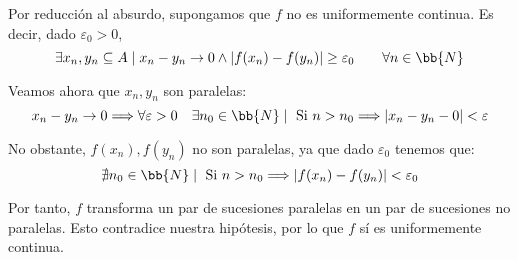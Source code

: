 \begin{ejercicio}
\begin{description}
        Por reducción al absurdo, supongamos que $f$ no es uniformemente continua. Es decir, dado $\varepsilon_0>0$,
        \begin{equation*}
            \exists x_n,y_n\subseteq A \mid x_n-y_n \to 0 \land |f(x_n)-f(y_n)| \geq \varepsilon_0 \qquad \forall n\in \bb{N}
        \end{equation*}

        Veamos ahora que $x_n,y_n$ son paralelas:
        \begin{equation*}
            x_n-y_n \to 0 \Longrightarrow 
            \forall {\varepsilon} >0\quad \exists n_0\in \bb{N}\mid \text{ Si } n>n_0 \Longrightarrow |x_n - y_n - 0| < {\varepsilon}
        \end{equation*}

        No obstante, $f(x_n),f(y_n)$ no son paralelas, ya que dado $\varepsilon_0$ tenemos que:
        \begin{equation*}
            \nexists n_0\in \bb{N} \mid \text{ Si } n>n_0 \Longrightarrow |f(x_n)-f(y_n)| < \varepsilon_0
        \end{equation*}

        Por tanto, $f$ transforma un par de sucesiones paralelas en un par de sucesiones no paralelas. Esto contradice nuestra hipótesis, por lo que $f$ sí es uniformemente continua. 
    \end{description}
\end{ejercicio}

